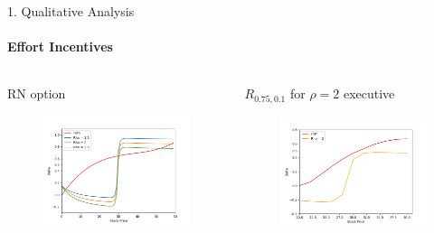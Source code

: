 \documentclass{beamer}
\begin{document}
\begin{frame}{1. Qualitative Analysis}
    \framesubtitle{Effort Incentives}

    \begin{columns}[c]
        \begin{column}{0.5\textwidth} 
            \centering
            RN option \\
            \begin{figure}[!h]
                \centering
                \includegraphics[width=\textwidth]{../fig/4/delta_comp.png}
            \end{figure}
        \end{column}
        \begin{column}{0.5\textwidth}
            \centering
            $R_{0.75, 0.1}$ for $\rho = 2$ executive \\
            \begin{figure}[!h]
                \centering
                \includegraphics[width=\textwidth]{../fig/4/r_delta_comp.png}
            \end{figure}
        \end{column}
    \end{columns}
\end{frame}
\end{document}

